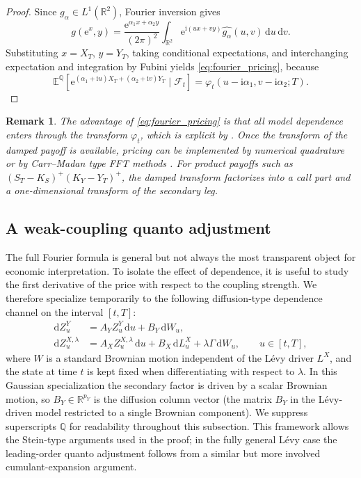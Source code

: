 \documentclass[10pt,a4paper,reqno]{amsart}
\newtheorem{remark}[theorem]{Remark}
\newcommand{\R}{\mathbb{R}}
\newcommand{\E}{\mathbb{E}}
\newcommand{\Q}{\mathbb{Q}}
\newcommand{\F}{\mathcal{F}}
\newcommand{\1}{\mathbbm{1}}
\newcommand{\dd}{\mathrm{d}}
\newcommand{\ii}{\mathrm{i}}
\newcommand{\ee}{\mathrm{e}}
\begin{document}
\begin{proof}
Since \(g_\alpha \in L^1(\R^2)\), Fourier inversion gives
\[
g(\ee^x,y)
= \frac{\ee^{\alpha_1 x+\alpha_2 y}}{(2\pi)^2}
   \int_{\R^2}
      \ee^{\ii(ux+vy)} \widehat{g_\alpha}(u,v)\,\dd u\,\dd v.
\]
Substituting \(x=X_T\), \(y=Y_T\), taking conditional expectations, and
interchanging expectation and integration by Fubini yields
\eqref{eq:fourier_pricing}, because
\[
\E^\Q\!\left[
  \ee^{(\alpha_1+\ii u)X_T + (\alpha_2+\ii v)Y_T}
  \mid \F_t
\right]
= \varphi_t(u-\ii\alpha_1,v-\ii\alpha_2;T).
\]
\end{proof}

\begin{remark}
The advantage of \eqref{eq:fourier_pricing} is that all model dependence enters
through the transform \(\varphi_t\), which is explicit by
. Once the transform of the damped payoff is available,
pricing can be implemented by numerical quadrature or by Carr--Madan type FFT
methods \citep{Car99}. For product payoffs such as
\((S_T-K_S)^+(K_Y-Y_T)^+\), the damped transform factorizes into a call part and
a one-dimensional transform of the secondary leg.
\end{remark}

\subsection{A weak-coupling quanto adjustment}

The full Fourier formula is general but not always the most transparent object
for economic interpretation. To isolate the effect of dependence, it is useful
to study the first derivative of the price with respect to the coupling
strength. We therefore specialize temporarily to the following diffusion-type
dependence channel on the interval \([t,T]\):
\begin{equation}\label{eq:weak_coupling_model}
\begin{aligned}
  \dd Z_u^{Y}
    &= A_Y Z_u^{Y}\,\dd u + B_Y\,\dd W_u,\\
  \dd Z_u^{X,\lambda}
    &= A_X Z_u^{X,\lambda}\,\dd u
       + B_X\,\dd L_u^X
       + \lambda \Gamma\,\dd W_u,
  \qquad u \in [t,T],
\end{aligned}
\end{equation}
where \(W\) is a standard Brownian motion independent of the Lévy driver
\(L^X\), and the state at time \(t\) is kept fixed when differentiating with
respect to \(\lambda\). In this Gaussian specialization the secondary factor is
driven by a scalar Brownian motion, so \(B_Y \in \R^{p_Y}\) is the diffusion
column vector (the matrix \(B_Y\) in the
Lévy-driven model restricted to a single Brownian component). We suppress
superscripts \(\Q\) for readability throughout this subsection. This framework
allows the Stein-type arguments used in the proof; in the fully general Lévy
case the leading-order quanto adjustment follows from a
similar but more involved cumulant-expansion argument.
\end{document}
